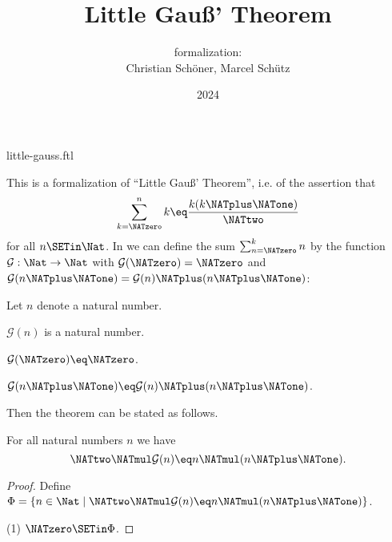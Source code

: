 \documentclass{article}
\title{Little Gauß' Theorem}
\author{\Naproche formalization:\\[0.5em]Christian Schöner, Marcel Schütz}
\date{2024}
\newcommand{\gauss}{\mathcal{G}}
\begin{document}
\begin{smodule}{little-gauss.ftl}
\maketitle


\noindent This is a formalization of ``Little Gauß' Theorem'', i.e. of
the assertion that
\[\sum_{k = \NATzero}^n k \eq \frac{k(k \NATplus \NATone)}\NATtwo\]
for all $n \SETin \Nat$.
In \Naproche we can define the sum $\sum_{n = \NATzero}^k n$ by the function
$\gauss : \Nat \to \Nat$ with $\gauss(\NATzero) = \NATzero$ and
$\gauss(n \NATplus \NATone) = \gauss(n) \NATplus (n \NATplus \NATone)$:

\begin{forthel}
  Let $n$ denote a natural number.

  \begin{signature*}
    $\gauss(n)$ is a natural number.
  \end{signature*}

  \begin{axiom*}
    $\gauss(\NATzero) \eq \NATzero$.
  \end{axiom*}

  \begin{axiom*}
    $\gauss(n \NATplus \NATone) \eq \gauss(n) \NATplus (n \NATplus \NATone)$.
  \end{axiom*}
\end{forthel}

\noindent Then the theorem can be stated as follows.

\begin{forthel}
  \begin{theorem*}[title=Little Gauß,id=little_gauss]
    For all natural numbers $n$ we have
    \[\NATtwo \NATmul \gauss(n) \eq n \NATmul (n \NATplus \NATone).\]
  \end{theorem*}
  \begin{proof}
    Define $\Phi = \{ n \in \Nat \mid \NATtwo \NATmul \gauss(n) \eq n \NATmul (n \NATplus \NATone) \}$.
    
    (1) $\NATzero \SETin \Phi$.


\end{proof}
\end{forthel}
\end{smodule}
\end{document}
